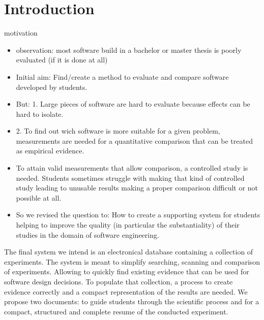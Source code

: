 

\section{Introduction}
\label{sec:introduction}

motivation

\begin{itemize}
\item observation: most software build in a bachelor or master thesis is poorly evaluated (if it is done at all)
\item Initial aim: Find/create a method to evaluate and compare software developed by students.
\item But: 1. Large pieces of software are hard to evaluate because effects can be hard to isolate.
\item 2.  To find out wich software is more suitable for a given problem, measurements are needed for a quantitative comparison that can be treated as empirical evidence.
\item To attain valid measurements that allow comparison, a controlled study is needed.
Students sometimes struggle with making that kind of controlled study  leading to unusable results making a proper comparison difficult or not possible at all.
\item So we revised the question to:
How to create a supporting system for students helping to improve the quality (in particular the substantiality) of their studies in the domain of software engineering.

\end{itemize}

The final system we intend is an electronical database containing a collection of experiments. The system is meant to simplify searching, scanning and comparison of experiments. Allowing to quickly find existing evidence that can be used for software design decisions. To populate that collection, a process to create evidence correctly and a compact representation of the results are needed. We propose two documents: \emph{\checklist} to guide students through the scientific process and \emph{\briefingform} for a compact, structured and complete resume of the conducted experiment. 



